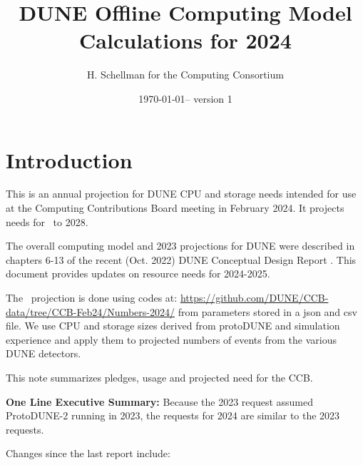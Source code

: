 \documentclass[12pt]{article}
\title{DUNE Offline Computing Model Calculations for 2024}
\author{H. Schellman for the Computing Consortium}
\date{\today -- version 1}
\begin{document}
\makeatletter
{}
\makeatother
\newcommand{\csvautotabularright}[2][]{\csvloop{autotabularright={#2},#1}}

\maketitle



\section{Introduction}

This is an annual projection for DUNE CPU and storage needs intended for use at the Computing Contributions Board meeting in February 2024. It projects needs for \ThisYear\ to 2028. 

The overall computing model  and 2023 projections for DUNE were described in chapters 6-13 of the recent (Oct. 2022) DUNE Conceptual Design Report \cite{DUNE:2022fcw}.   This document provides updates on resource needs for 2024-2025. 

The \ThisYear\ projection is done using codes at: \href{https://github.com/DUNE/CCB-data/tree/CCB-Feb24/Numbers-2024/}{https://github.com/DUNE/CCB-data/tree/CCB-Feb24/Numbers-2024/} from parameters stored in a json and csv file. We use CPU and storage sizes derived from protoDUNE and simulation experience and apply them to projected numbers of events from the various DUNE detectors. 

This note summarizes pledges, usage and projected need for the CCB.

{\bf One Line Executive Summary:} Because the 2023 request assumed ProtoDUNE-2 running in 2023, the requests for 2024 are similar to the 2023 requests.





Changes since the last report \cite{CCB2023Report, CCB2023Minutes} include:
\end{document}

